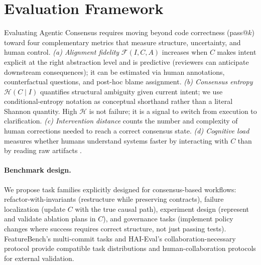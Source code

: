 
\section{Evaluation Framework}
Evaluating Agentic Consensus requires moving beyond code correctness (pass@$k$) toward four complementary metrics that measure structure, uncertainty, and human control.
\textit{(a) Alignment fidelity} $\mathcal{F}(I,C,A)$ increases when $C$ makes intent explicit at the right abstraction level and is predictive (reviewers can anticipate downstream consequences); it can be estimated via human annotations, counterfactual questions, and post-hoc blame assignment.
\textit{(b) Consensus entropy} $\mathcal{H}(C\mid I)$ quantifies structural ambiguity given current intent; we use conditional-entropy notation as conceptual shorthand rather than a literal Shannon quantity. High $\mathcal{H}$ is not failure; it is a signal to switch from execution to clarification.
\textit{(c) Intervention distance} counts the number and complexity of human corrections needed to reach a correct consensus state.
\textit{(d) Cognitive load} measures whether humans understand systems faster by interacting with $C$ than by reading raw artifacts \cite{sweller1988cognitive,klein2005common,siemon2022taxonomy,lee2004trust}.

\paragraph{\textbf{Benchmark design.}}
We propose task families explicitly designed for consensus-based workflows: refactor-with-invariants (restructure while preserving contracts), failure localization (update $C$ with the true causal path), experiment design (represent and validate ablation plans in $C$), and governance tasks (implement policy changes where success requires correct structure, not just passing tests).
FeatureBench's multi-commit tasks \cite{zhou2026featurebench} and HAI-Eval's collaboration-necessary protocol \cite{luo2025haieval} provide compatible task distributions and human-collaboration protocols for external validation.
